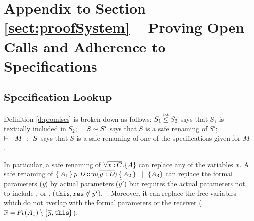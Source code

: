 \section{Appendix to Section \ref{sect:proofSystem} -- Proving Open Calls and Adherence to \SpecLang Specifications} \label{app:proof}


\subsection{Specification Lookup}

Definition \ref{d:promises} is broken down as follows:  $S_1 \txtin  S_2$ says that $S_1$ is textually included in $S_2$; \ \ $S \thicksim S'$ says that $S$ is a safe renaming of $S'$; \ \   ${\vdash \ \ M\ \ \mathbf{:}\ \ S}$ says that $S$ is a safe renaming of one of the specifications given for $M$. 
 
In particular, a safe renaming of  ${ \forall {\overline {x:C}}.{{\{}}{A}{{\}}}  }$ can replace any of the variables $\overline x$.  
A safe renaming  of ${\mprepostN{A_1}{p\ D}{m}{y}{D}{A_2} {A_3}}$  can replace  the formal parameters ($\overline y$) by actual parameters  ($\overline {y'}$) but requires the actual parameters  not to include , or , (\ie $\mbox{\normalfont{\texttt{this}}}, \mbox{\normalfont{\texttt{res}}}\notin \overline{y'}$). -- %
Moreover, it can replace  the free variables which do not overlap with the formal parameters or the receiver ( $\overline{x}={\hspace{-1pt}F\hspace{-1pt}}v(A_1)\setminus\{{\overline y},\mbox{\normalfont{\texttt{this}}}\}$).


